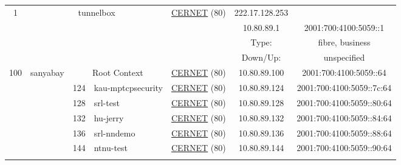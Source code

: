 \begin{small}
\begin{center}
\begin{longtable}{|c|c|c|c|c|c|c|c|}
\endhead
 \multirow{4}{*}{\tiny{1}} & \multicolumn{3}{|c|}{\multirow{4}{*}{\tiny{tunnelbox}}} & \multicolumn{2}{|c|}{\multirow{4}{*}{\tiny{\href{http://www.cernet.edu.cn}{CERNET} (80)}}} & \tiny{222.17.128.253} & \frownie{} \\* \cline{7-7}\cline{8-8}
  & \multicolumn{3}{|c|}{} & \multicolumn{2}{|c|}{} & \tiny{10.80.89.1} & \tiny{2001:700:4100:5059::1} \\* \cline{7-7}\cline{8-8}
  & \multicolumn{3}{|c|}{} & \multicolumn{2}{|c|}{} & Type: & fibre, business \\* \cline{7-7}\cline{8-8}
  & \multicolumn{3}{|c|}{} & \multicolumn{2}{|c|}{} & Down/Up:  & unspecified \\ \hline
 \multirow{8}{*}{\tiny{100}} & \multicolumn{1}{|l|}{\multirow{8}{*}{\tiny{sanyabay}}} & \multicolumn{2}{|c|}{\tiny{Root Context}} & \multicolumn{2}{|c|}{\tiny{\href{http://www.cernet.edu.cn}{CERNET} (80)}} & \tiny{10.80.89.100} & \tiny{2001:700:4100:5059::64} \\* \cline{3-3}\cline{4-4}\cline{5-5}\cline{6-6}\cline{7-7}\cline{8-8}
  &  & \tiny{124} & \multicolumn{1}{|l|}{\tiny{kau-mptcpsecurity}} & \multicolumn{2}{|c|}{\tiny{\href{http://www.cernet.edu.cn}{CERNET} (80)}} & \tiny{10.80.89.124} & \tiny{2001:700:4100:5059::7c:64} \\* \cline{3-3}\cline{4-4}\cline{5-5}\cline{6-6}\cline{7-7}\cline{8-8}
  &  & \tiny{128} & \multicolumn{1}{|l|}{\tiny{srl-test}} & \multicolumn{2}{|c|}{\tiny{\href{http://www.cernet.edu.cn}{CERNET} (80)}} & \tiny{10.80.89.128} & \tiny{2001:700:4100:5059::80:64} \\* \cline{3-3}\cline{4-4}\cline{5-5}\cline{6-6}\cline{7-7}\cline{8-8}
  &  & \tiny{132} & \multicolumn{1}{|l|}{\tiny{hu-jerry}} & \multicolumn{2}{|c|}{\tiny{\href{http://www.cernet.edu.cn}{CERNET} (80)}} & \tiny{10.80.89.132} & \tiny{2001:700:4100:5059::84:64} \\* \cline{3-3}\cline{4-4}\cline{5-5}\cline{6-6}\cline{7-7}\cline{8-8}
  &  & \tiny{136} & \multicolumn{1}{|l|}{\tiny{srl-nndemo}} & \multicolumn{2}{|c|}{\tiny{\href{http://www.cernet.edu.cn}{CERNET} (80)}} & \tiny{10.80.89.136} & \tiny{2001:700:4100:5059::88:64} \\* \cline{3-3}\cline{4-4}\cline{5-5}\cline{6-6}\cline{7-7}\cline{8-8}
  &  & \tiny{144} & \multicolumn{1}{|l|}{\tiny{ntnu-test}} & \multicolumn{2}{|c|}{\tiny{\href{http://www.cernet.edu.cn}{CERNET} (80)}} & \tiny{10.80.89.144} & \tiny{2001:700:4100:5059::90:64} \\* \cline{3-3}\cline{4-4}\cline{5-5}\cline{6-6}\cline{7-7}\cline{8-8}

\end{longtable}
\end{center}
\end{small}
